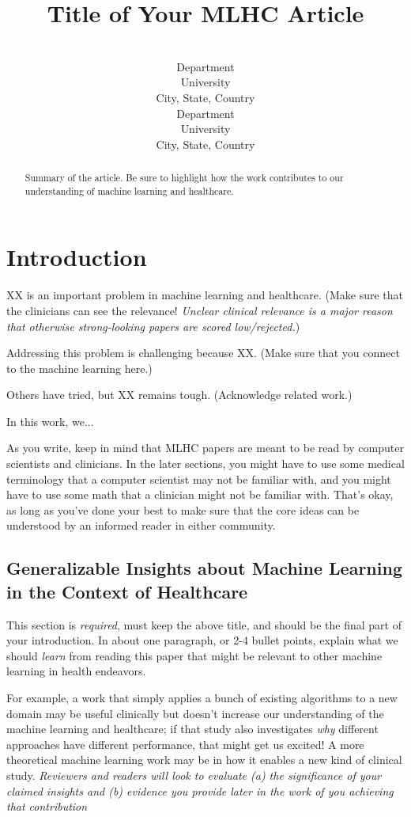 \documentclass[pmlr]{jmlr}%
\title[Short Title]{Title of Your MLHC Article}
\author{\Name{Firstname Lastname}
       \Email{name@email.edu}\\ 
       \addr Department\\
       University\\
       City, State, Country 
       \AND
       \Name{Firstname Lastname}
       \Email{name@email.edu}\\ 
       \addr Department\\
       University\\
       City, State, Country}
\begin{document}
\maketitle

\begin{abstract}
  Summary of the article.  Be sure to highlight how the work
  contributes to our understanding of machine learning and healthcare.
\end{abstract}

\section{Introduction}

XX is an important problem in machine learning and healthcare.  (Make
sure that the clinicians can see the relevance! \emph{Unclear clinical
  relevance is a major reason that otherwise strong-looking papers are
  scored low/rejected.})

Addressing this problem is challenging because XX.  (Make sure that
you connect to the machine learning here.)  

Others have tried, but XX remains tough.  (Acknowledge related work.)

In this work, we...

As you write, keep in mind that MLHC papers are meant to be read by
computer scientists and clinicians.  In the later sections, you might
have to use some medical terminology that a computer scientist may not
be familiar with, and you might have to use some math that a clinician
might not be familiar with.  That's okay, as long as you've done your
best to make sure that the core ideas can be understood by an informed
reader in either community.

\subsection*{Generalizable Insights about Machine Learning in the Context of Healthcare}
This section is \emph{required}, must keep the above title, and should
be the final part of your introduction.  In about one paragraph, or
2-4 bullet points, explain what we should \emph{learn} from reading
this paper that might be relevant to other machine learning in health
endeavors.

For example, a work that simply applies a bunch of existing algorithms
to a new domain may be useful clinically but doesn't increase our
understanding of the machine learning and healthcare; if that study
also investigates \emph{why} different approaches have different
performance, that might get us excited!  A more theoretical machine
learning work may be in how it enables a new kind of clinical study.
\emph{Reviewers and readers will look to evaluate (a) the significance
  of your claimed insights and (b) evidence you provide later in the
  work of you achieving that contribution}
\end{document}

